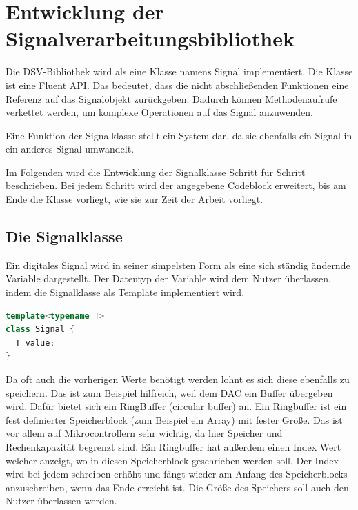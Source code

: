 \section{Entwicklung der Signalverarbeitungsbibliothek}
\label{chap:signalbibliothek}

Die DSV-Bibliothek wird als eine Klasse namens Signal implementiert.
Die Klasse ist eine Fluent API\cite{fluentAPI}. Das bedeutet, dass die
nicht abschließenden Funktionen eine Referenz auf das Signalobjekt zurückgeben. 
Dadurch können Methodenaufrufe verkettet werden, um komplexe Operationen auf 
das Signal anzuwenden.

Eine Funktion der Signalklasse stellt ein System dar, da sie ebenfalls
ein Signal in ein anderes Signal umwandelt.

Im Folgenden wird die Entwicklung der Signalklasse Schritt für Schritt
beschrieben. Bei jedem Schritt wird der angegebene Codeblock erweitert,
bis am Ende die Klasse vorliegt, wie sie zur Zeit der Arbeit vorliegt.

\subsection{Die Signalklasse}

Ein digitales Signal wird in seiner simpelsten Form als eine sich ständig
ändernde Variable dargestellt. Der Datentyp der Variable wird dem Nutzer 
überlassen, indem die Signalklasse als Template implementiert wird. 

\begin{lstlisting}[language=C++, 
                       frame=single, 
                       caption={Signalklasse Version 0.1},
                       captionpos=b]
template<typename T>
class Signal {
  T value;
}
\end{lstlisting}

Da oft auch die vorherigen Werte benötigt werden lohnt es sich diese ebenfalls 
zu speichern. Das ist zum Beispiel hilfreich, weil dem DAC ein Buffer übergeben 
wird.
Dafür bietet sich ein RingBuffer (circular buffer) \cite{ringbuffer} an. 
Ein Ringbuffer ist ein fest definierter
Speicherblock (zum Beispiel ein Array) mit fester Größe. Das ist vor allem
auf Mikrocontrollern sehr 
wichtig, da hier Speicher und Rechenkapazität begrenzt sind. Ein Ringbuffer hat außerdem
einen Index Wert welcher anzeigt, wo in diesen Speicherblock geschrieben 
werden soll. Der Index wird bei jedem schreiben erhöht und fängt wieder am Anfang
des Speicherblocks anzuschreiben, wenn das Ende erreicht ist.
Die Größe des Speichers soll auch den Nutzer überlassen werden.

